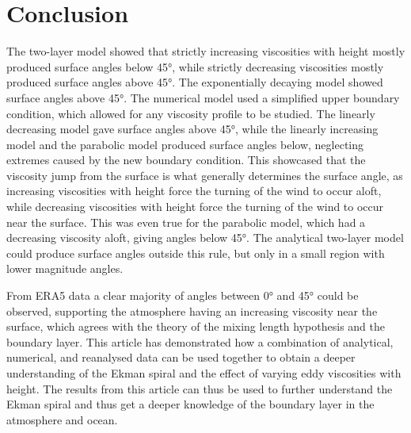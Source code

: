 \section{Conclusion}
The two-layer model showed that strictly increasing viscosities with height mostly produced surface angles below \ang{45}, while strictly decreasing viscosities mostly produced surface angles above \ang{45}. The exponentially decaying model showed surface angles above \ang{45}. The numerical model used a simplified upper boundary condition, which allowed for any viscosity profile to be studied. The linearly decreasing model gave surface angles above \ang{45}, while the linearly increasing model and the parabolic model produced surface angles below, neglecting extremes caused by the new boundary condition. This showcased that the viscosity jump from the surface is what generally determines the surface angle, as increasing viscosities with height force the turning of the wind to occur aloft, while decreasing viscosities with height force the turning of the wind to occur near the surface. This was even true for the parabolic model, which had a decreasing viscosity aloft, giving angles below \ang{45}. The analytical two-layer model could produce surface angles outside this rule, but only in a small region with lower magnitude angles. 

From ERA5 data a clear majority of angles between \ang{0} and \ang{45} could be observed, supporting the atmosphere having an increasing viscosity near the surface, which agrees with the theory of the mixing length hypothesis and the boundary layer. This article has demonstrated how a combination of analytical, numerical, and reanalysed data can be used together to obtain a deeper understanding of the Ekman spiral and the effect of varying eddy viscosities with height. The results from this article can thus be used to further understand the Ekman spiral and thus get a deeper knowledge of the boundary layer in the atmosphere and ocean.